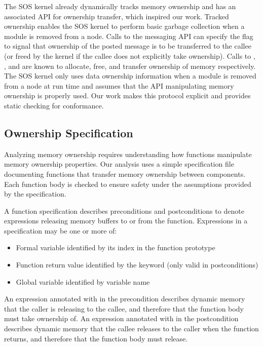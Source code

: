 The SOS kernel already dynamically tracks memory ownership and has an
associated API for ownership transfer, which inspired our work.  
%
Tracked ownership enables the SOS kernel to perform basic garbage collection
when a module is removed from a node.
%
Calls to the messaging API can specify the  flag to
signal that ownership of the posted message is to be transferred to the callee
(or freed by the kernel if the callee does not explicitly take ownership).  
%
Calls to , , and 
are known to allocate, free, and transfer ownership of memory respectively.
%
The SOS kernel only uses data ownership information when a module is removed
from a node at run time and assumes that the API manipulating memory ownership
is properly used.
%
Our work makes this protocol explicit and provides static checking for
conformance.



\subsection{Ownership Specification}


%  
%  



Analyzing memory ownership requires understanding how functions manipulate
memory ownership properties.
%
Our analysis uses a simple specification file documenting functions that
transfer memory ownership between components.
%
Each function body is checked to ensure safety under the assumptions provided
by the specification.  



A function specification describes preconditions and postconditions to
denote expressions releasing memory buffers to or from the function.
%
Expressions in a specification may be one or more of: 
%
\begin{itemize}
%
\item Formal variable identified by its index in the function prototype
%
\item Function return value identified by the keyword  (only
valid in postconditions)
%
\item Global variable identified by variable name
%
\end{itemize}
%
An expression annotated with  in the precondition describes
dynamic memory that the caller is releasing to the callee, and therefore
that the function body must take ownership of.
%
An expression annotated with  in the postcondition describes
dynamic memory that the callee releases to the caller when the function
returns, and therefore that the function body must release.



